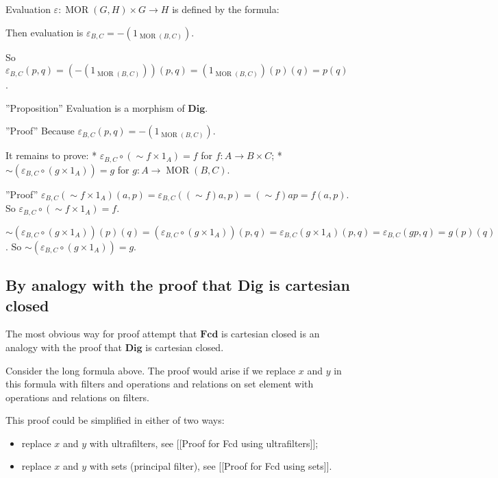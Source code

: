 Evaluation $\varepsilon : \operatorname{MOR} ( G , H) \times G \rightarrow H$ is defined by the formula:

Then evaluation is $\varepsilon_{B, C} = - ( 1_{\operatorname{MOR} ( B , C)})$.

So $\varepsilon_{B, C} ( p , q) = ( - ( 1_{\operatorname{MOR} ( B , C)})) ( p , q) = ( 1_{\operatorname{MOR} ( B , C)}) ( p) ( q) = p ( q)$.

''Proposition'' Evaluation is a morphism of $\mathbf{Dig}$.

''Proof'' Because $\varepsilon_{B, C} ( p , q) = - ( 1_{\operatorname{MOR} ( B , C)})$.

It remains to prove:
* $\varepsilon_{B, C} \circ ( \sim f \times 1_{A}) = f$ for $f : A \rightarrow B \times C$;
* $\sim ( \varepsilon_{B, C} \circ ( g \times 1_{A})) = g$ for $g : A \rightarrow \operatorname{MOR} ( B , C)$.

''Proof'' $\varepsilon_{B, C} ( \sim f \times 1_{A}) ( a , p) = \varepsilon_{B, C} ( ( \sim f) a , p) = ( \sim f) a p = f ( a , p)$. So $\varepsilon_{B, C} \circ ( \sim f \times 1_{A}) = f$.

  $\sim ( \varepsilon_{B, C} \circ ( g \times 1_{A})) ( p) ( q) = ( \varepsilon_{B, C} \circ ( g \times 1_{A})) ( p , q) = \varepsilon_{B, C} ( g \times 1_{A}) ( p , q) = \varepsilon_{B, C} ( g p , q) = g ( p) ( q)$. So $\sim ( \varepsilon_{B, C} \circ ( g \times 1_{A})) = g$.

\subsection{By analogy with the proof that Dig is cartesian closed}

The most obvious way for proof attempt that $\mathbf{Fcd}$ is cartesian closed is an analogy with the proof that
$\mathbf{Dig}$ is cartesian closed.

Consider the long formula above. The proof would arise if we replace $x$ and $y$ in this formula with filters and operations and relations on set element with operations and relations on filters.

This proof could be simplified in either of two ways:
\begin{itemize}
\item replace $x$ and $y$ with ultrafilters, see [[Proof for Fcd using ultrafilters]];
\item replace $x$ and $y$ with sets (principal filter), see [[Proof for Fcd using sets]].
\end{itemize}


